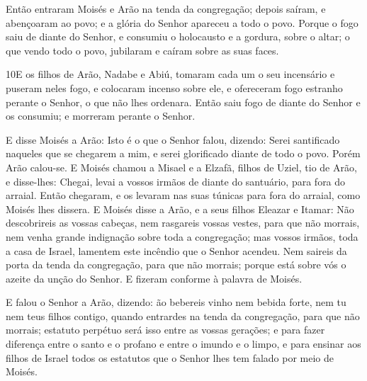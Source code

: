 Então entraram Moisés e Arão na tenda da congregação; depois
saíram, e abençoaram ao povo; e a glória do Senhor apareceu a todo o
povo. Porque o fogo saiu de diante do Senhor, e consumiu o
holocausto e a gordura, sobre o altar; o que vendo todo o povo,
jubilaram e caíram sobre as suas faces.

\medskip

\lettrine{10} E os filhos de Arão, Nadabe e Abiú, tomaram cada
um o seu incensário e puseram neles fogo, e colocaram incenso sobre
ele, e ofereceram fogo estranho perante o Senhor, o que não lhes
ordenara. Então saiu fogo de diante do Senhor e os consumiu; e
morreram perante o Senhor.

E disse Moisés a Arão: Isto é o que o Senhor falou, dizendo: Serei
santificado naqueles que se chegarem a mim, e serei glorificado
diante de todo o povo. Porém Arão calou-se. E Moisés chamou a
Misael e a Elzafã, filhos de Uziel, tio de Arão, e disse-lhes:
Chegai, levai a vossos irmãos de diante do santuário, para fora do
arraial. Então chegaram, e os levaram nas suas túnicas para fora
do arraial, como Moisés lhes dissera. E Moisés disse a Arão, e a
seus filhos Eleazar e Itamar: Não descobrireis as vossas cabeças,
nem rasgareis vossas vestes, para que não morrais, nem venha grande
indignação sobre toda a congregação; mas vossos irmãos, toda a casa
de Israel, lamentem este incêndio que o Senhor acendeu. Nem
saireis da porta da tenda da congregação, para que não morrais;
porque está sobre vós o azeite da unção do Senhor. E fizeram
conforme à palavra de Moisés.

E falou o Senhor a Arão, dizendo: ão bebereis vinho nem
bebida forte, nem tu nem teus filhos contigo, quando entrardes na
tenda da congregação, para que não morrais; estatuto perpétuo será
isso entre as vossas gerações; e para fazer diferença entre o
santo e o profano e entre o imundo e o limpo, e para ensinar
aos filhos de Israel todos os estatutos que o Senhor lhes tem falado
por meio de Moisés.

